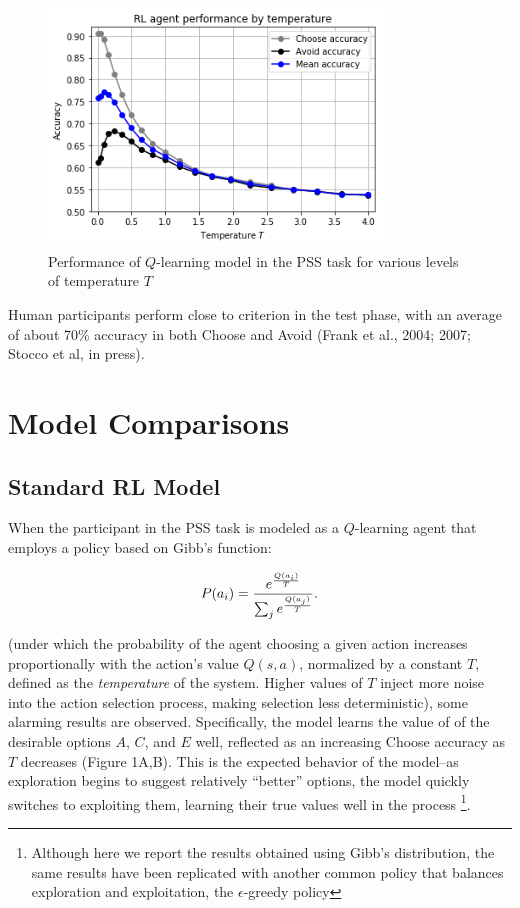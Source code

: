 \documentclass[10pt,letterpaper]{article}
\begin{document}
\begin{figure}[ht]
	\begin{center}
		\includegraphics[width=3.5in]{rl-performance.png}
	\end{center}
	\caption{Performance of $Q$-learning model in the PSS task for various levels of temperature $T$} 
	\label{RL-agent-performance}
\end{figure}

Human participants perform close to criterion in the test phase, with an average of about 70\% accuracy in both Choose and Avoid (Frank et al., 2004; 2007; Stocco et al, in press).

\section{Model Comparisons}

\subsection{Standard RL Model}

When the participant in the PSS task is modeled as a $Q$-learning agent that employs a policy based on Gibb’s function:

\begin{equation}
P(a_i) = \frac{e^{\frac{Q(a_i)}{T}}}{\sum_{j} e^{\frac{Q(a_j)}{T}}}\\.
\end{equation}

(under which the probability of the agent choosing a given action increases proportionally with the action's value $Q(s,a)$, normalized by a constant $T$, defined as the \emph{temperature} of the system. Higher values of $T$ inject more noise into the action selection process, making selection less deterministic), some alarming results are observed. Specifically, the model learns the value of of the desirable options $A$, $C$, and $E$ well, reflected as an increasing Choose accuracy as $T$ decreases (Figure 1A,B). This is the expected behavior of the model--as exploration begins to suggest relatively ``better'' options, the model quickly switches to exploiting them, learning their true values well in the process \footnote{Although here we report the results obtained using Gibb's distribution, the same results have been replicated with another common policy that balances exploration and exploitation, the $\epsilon$-greedy policy}. 
\end{document}
